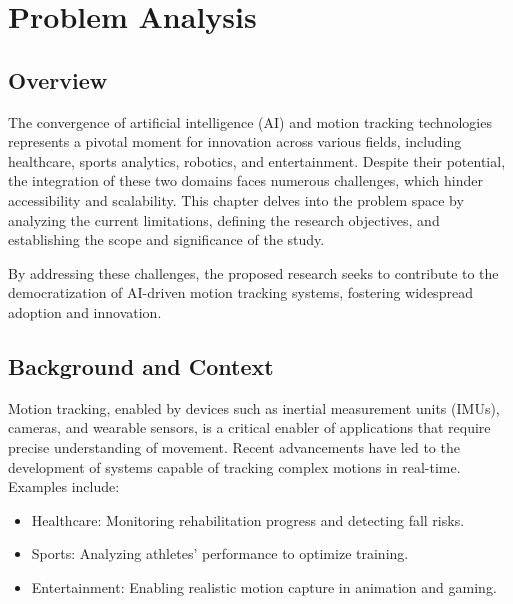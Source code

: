 \chapter{Problem Analysis}



\section{Overview}
The convergence of artificial intelligence (AI) and motion tracking technologies represents a pivotal moment for innovation across various fields, including healthcare, sports analytics, robotics, and entertainment. Despite their potential, the integration of these two domains faces numerous challenges, which hinder accessibility and scalability. This chapter delves into the problem space by analyzing the current limitations, defining the research objectives, and establishing the scope and significance of the study.

By addressing these challenges, the proposed research seeks to contribute to the democratization of AI-driven motion tracking systems, fostering widespread adoption and innovation.

\section{Background and Context}
Motion tracking, enabled by devices such as inertial measurement units (IMUs), cameras, and wearable sensors, is a critical enabler of applications that require precise understanding of movement. Recent advancements have led to the development of systems capable of tracking complex motions in real-time. Examples include:

\begin{itemize}
    \item Healthcare: Monitoring rehabilitation progress and detecting fall risks.
    \item Sports: Analyzing athletes’ performance to optimize training.
    \item Entertainment: Enabling realistic motion capture in animation and gaming.
\end{itemize}

